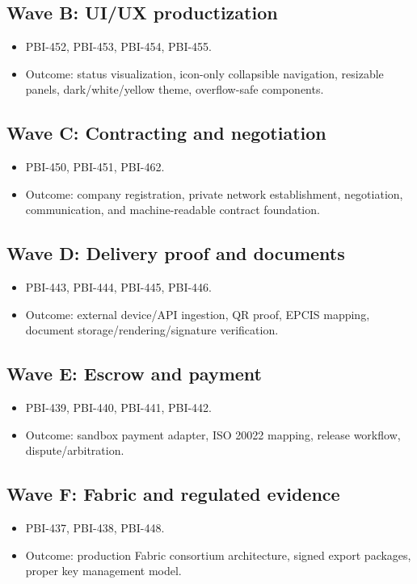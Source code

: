 \documentclass[11pt]{article}
\begin{document}
\subsection{Wave B: UI/UX productization}
\begin{itemize}
  \item PBI-452, PBI-453, PBI-454, PBI-455.
  \item Outcome: status visualization, icon-only collapsible navigation, resizable panels, dark/white/yellow theme, overflow-safe components.
\end{itemize}

\subsection{Wave C: Contracting and negotiation}
\begin{itemize}
  \item PBI-450, PBI-451, PBI-462.
  \item Outcome: company registration, private network establishment, negotiation, communication, and machine-readable contract foundation.
\end{itemize}

\subsection{Wave D: Delivery proof and documents}
\begin{itemize}
  \item PBI-443, PBI-444, PBI-445, PBI-446.
  \item Outcome: external device/API ingestion, QR proof, EPCIS mapping, document storage/rendering/signature verification.
\end{itemize}

\subsection{Wave E: Escrow and payment}
\begin{itemize}
  \item PBI-439, PBI-440, PBI-441, PBI-442.
  \item Outcome: sandbox payment adapter, ISO 20022 mapping, release workflow, dispute/arbitration.
\end{itemize}

\subsection{Wave F: Fabric and regulated evidence}
\begin{itemize}
  \item PBI-437, PBI-438, PBI-448.
  \item Outcome: production Fabric consortium architecture, signed export packages, proper key management model.
\end{itemize}
\end{document}
